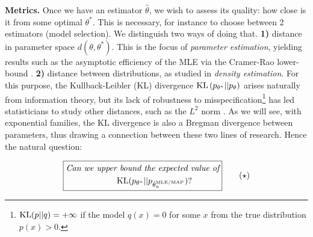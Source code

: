 \documentclass[twoside]{article}
\newcommand{\nat}{\theta}
\begin{document}
{\bf Metrics.}
Once we have an estimator $\hat \nat$, we wish to assess its quality:
how close is it from some optimal $\nat^*$.
This is necessary, for instance to choose between 2 estimators (model selection).
We distinguish two ways of doing that.
{\bf 1)} distance in parameter space $d(\nat,\nat^*)$. This is the focus of \emph{parameter estimation}, yielding results such as the asymptotic efficiency of the MLE via the Cramer-Rao lower-bound \citep{aitken1942estimation}.
{\bf 2)} distance between distributions, as studied in \emph{density estimation}.
For this purpose, the Kullback-Leibler (KL) divergence $\KL\paren{p_{\nat^*} || p_{\nat} }$  arises naturally from information theory,
but its lack of robustness to misspecification\footnote{
$\mathrm{KL}(p||q) = +\infty$ if the model $q(x)=0$ for some $x$ from the true distribution$p(x)>0$.
}
has led statisticians to study other distances, such as the $L^2$ norm \citep[e.g. \S1.2]{tsybakov2009introduction}.
As we will see, with exponential families, the KL divergence is also a Bregman divergence between parameters, thus drawing a connection between these two lines of research.
Hence the natural question:



\begin{equation}
\boxed{
\begin{aligned}
	\textit{Can we upper}&\textit{ bound  the expected value of} \\
	&\KL(p_{\nat^*} || p_{\hat \nat_n^\text{MLE/MAP} })?
\end{aligned}
}
\tag{$\star$}
\label{problem}
\end{equation}
\end{document}
